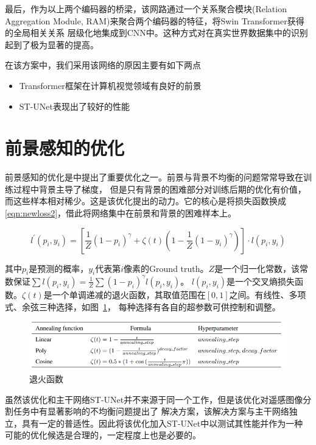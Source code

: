 \documentclass[a4paper,twoside,zihao=5,UTF8]{ctexrep}
\begin{document}
最后，作为以上两个编码器的桥梁，该网路通过一个关系聚合模块(Relation Aggregation Module, RAM)来聚合两个编码器的特征，将Swin Transformer获得的全局相关关系
层级化地集成到CNN中。这种方式对在真实世界数据集中的识别起到了极为显著的提高\cite{stunet}。

在该方案中，我们采用该网络的原因主要有如下两点

\begin{itemize}
    \item Transformer框架在计算机视觉领域有良好的前景
    \item ST-UNet表现出了较好的性能
\end{itemize}


\section{前景感知的优化}
前景感知的优化是\cite{farseg}中提出了重要优化之一。前景与背景不均衡的问题常常导致在训练过程中背景主导了梯度，
但是只有背景的困难部分对训练后期的优化有价值，而这些样本相对稀少。这是该优化提出的动力。它的核心是将损失函数换成
\eqref{eqn:newloss2}，借此将网络集中在前景和背景的困难样本上。

\begin{equation}
    \label{eqn:newloss2}
    l^{'}(p_i,y_i)=[\frac{1}{Z}(1-p_i)^\gamma+\zeta (t)(1-\frac{1}{Z}(1-y_i)^\gamma)]\cdot l(p_i,y_i)
\end{equation}

其中$p_i$是预测的概率，$y_i$代表第$i$像素的Ground truth。$Z$是一个归一化常数，该常数保证$\sum l(p_i,y_i)=\frac{1}{Z}\sum(1-p_i)^\gamma l(p_i,y_i)$。
$l(p_i,y_i)$是一个交叉熵损失函数。$\zeta(t)$是一个单调递减的退火函数，其取值范围在$[0,1]$之间。有线性、多项式、余弦三种选择，如图~\ref{fig:annel_func}，
每种选择有各自的超参数可供控制和调整。

\begin{figure}[htbp]
    \includegraphics[width=\textwidth]{annealing_funcs.png}
    \centering
    \caption{退火函数}
    \label{fig:annel_func}
\end{figure}

虽然该优化和主干网络ST-UNet并不来源于同一个工作，但是该优化对遥感图像分割任务中有显著影响的不均衡问题提出了
解决方案，该解决方案与主干网络独立，具有一定的普适性。因此将该优化加入ST-UNet中以测试其性能并作为一种
可能的优化候选是合理的，一定程度上也是必要的。
\end{document}
